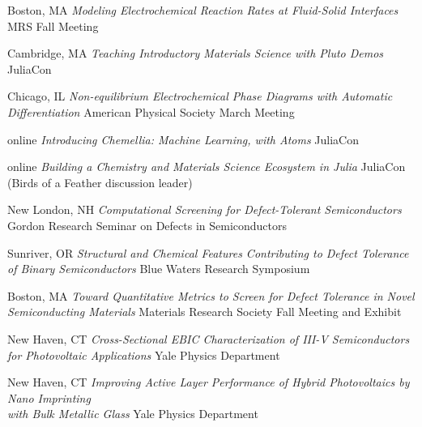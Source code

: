 {Boston, MA}
{\textit{Modeling Electrochemical Reaction Rates at Fluid-Solid Interfaces}}
{MRS Fall Meeting}

\vspace{\talksep}
\datedsubsection{}
        {Cambridge, MA}
        {\textit{Teaching Introductory Materials Science with Pluto Demos}}
        {JuliaCon}

\vspace{\talkyearsep}
	{Chicago, IL}
	{\textit{Non-equilibrium Electrochemical Phase Diagrams with Automatic Differentiation}}
    {American Physical Society March Meeting}

\vspace{\talkyearsep}
	{online}
	{\textit{Introducing Chemellia: Machine Learning, with Atoms}}
    {JuliaCon}

\vspace{\talksep}
\datedsubsection{}
	{online}
	{\textit{Building a Chemistry and Materials Science Ecosystem in Julia}}
    {JuliaCon (Birds of a Feather discussion leader)}

\vspace{\talkyearsep}
	{New London, NH}
	{\textit{Computational Screening for Defect-Tolerant Semiconductors}}
    {Gordon Research Seminar on Defects in Semiconductors}

\vspace{\talksep}
\datedsubsection{}
	{Sunriver, OR}
	{\textit{Structural and Chemical Features Contributing to Defect Tolerance of Binary Semiconductors}}
    {Blue Waters Research Symposium}

\vspace{\talkyearsep}
    {Boston, MA}
    {\textit{Toward Quantitative Metrics to Screen for Defect Tolerance in Novel Semiconducting Materials}}
    {Materials Research Society Fall Meeting and Exhibit}

\vspace{\talkyearsep}
    {New Haven, CT}
    {\textit{Cross-Sectional EBIC Characterization of III-V Semiconductors for Photovoltaic Applications}}
    {Yale Physics Department}

\vspace{\talkyearsep}
    {New Haven, CT}
    {\textit{Improving Active Layer Performance of Hybrid Photovoltaics by Nano Imprinting\\ with Bulk Metallic Glass}}
    {Yale Physics Department}

